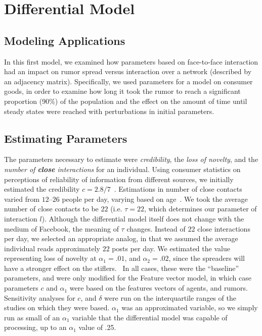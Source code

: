 \section{Differential Model }
\label{sec:diffmodel}

\subsection{Modeling Applications}
\label{subsec:diffmodeapp}

In this first model, we examined how parameters based on face-to-face interaction had an impact on rumor spread versus interaction over a network (described by an adjacency matrix).
Specifically, we used parameters for a model on consumer goods, in order to examine how long it took the rumor to reach a significant proportion (90\%) of the population and the effect on the amount of time until steady states were reached with perturbations in initial parameters.

\subsection{Estimating Parameters}
\label{subsec:diffmodeeparam}

The parameters necessary to estimate were \textit{credibility}, the
\textit{loss of novelty}, and the \textit{number of \textbf{close} interactions} for an individual.
Using consumer statistics on perceptions of reliability of information from different sources, we initially estimated the credibility $ c = 2.8/7 $~\cite{kamins-1997}.
Estimations in number of close contacts varied from $ 12 $--$ 26 $ people per day, varying based on age~\cite{cahill-1996, mossong-2008, edmunds-2006}.
We took the average number of close contacts to be $ 22 $ (i.e. $ \tau = 22 $, which determines our parameter of interaction $ l $).
Although the differential model itself does not change with the medium of Facebook, the meaning of $ \tau $ changes.
Instead of $ 22 $ close interactions per day, we selected an appropriate analog, in that we assumed the average individual reads approximately $ 22 $ posts per day.
We estimated the value representing loss of novelty at $ \alpha_1 = .01 $, and  $ \alpha_2 = .02 $, since the spreaders will have a stronger effect on the stiflers.
\
In all cases, these were the ``baseline'' parameters, and were only modified for the Feature vector model, in which case parameters $ c $ and $ \alpha_1 $  were based on the features vectors of agents, and rumors.
Sensitivity analyses for $ c $, and $ \delta $ were run on the interquartile ranges of the studies on which they were based.
$ \alpha_1 $ was an approximated variable, so we simply run as small of an $ \alpha_1 $ variable that the differential model was capable of processing, up to an $ \alpha_1 $ value of .25.
